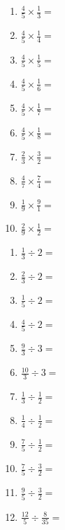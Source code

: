 \documentclass{article}
\begin{document}
\clearpage






\begin{enumerate}
	\item $\frac{4}{5}\times\frac{1}{3}=$
	\item $\frac{4}{5}\times\frac{1}{4}=$
	\item $\frac{4}{5}\times\frac{1}{5}=$
	\item $\frac{4}{5}\times\frac{1}{6}=$
	\item $\frac{4}{5}\times\frac{1}{7}=$
	\item $\frac{4}{5}\times\frac{1}{8}=$
	\item $\frac{2}{3}\times\frac{3}{2}=$
	\item $\frac{4}{7}\times\frac{7}{4}=$
	\item $\frac{1}{9}\times\frac{9}{1}=$
	\item $\frac{2}{9}\times\frac{1}{2}=$
\end{enumerate}




\clearpage




\begin{enumerate}
	\item $\frac{1}{3}\div2=$
	\item $\frac{2}{3}\div 2=$
	\item $\frac{1}{5}\div 2=$
	\item $\frac{4}{5}\div 2=$
	\item $\frac{9}{3}\div 3=$
	\item $\frac{10}{3}\div 3=$
	\item $\frac{1}{3}\div\frac{1}{2}=$
	\item $\frac{1}{4}\div\frac{1}{2}=$
	\item $\frac{7}{5}\div\frac{1}{2}=$
	\item $\frac{7}{5}\div\frac{3}{2}=$
	\item $\frac{9}{5}\div\frac{3}{2}=$
	\item $\frac{12}{5}\div\frac{8}{35}=$
\end{enumerate}
\end{document}
